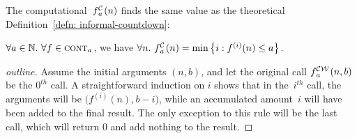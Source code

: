 \noindent The computational~$\cdt{f}{a}(n)$
finds the same value as the theoretical
Definition~\ref{defn: informal-countdown}:
\begin{thm} \label{thm: cdt-repeat}
	$\forall a \in \mathbb{N}.~ \forall f\in \text{\scshape{cont}}_{a}$, we have
$	\forall n.~ \cdt{f}{a}(n) = \min\left\{ i : f^{(i)}(n) \le a \right\} $.
\end{thm}
\begin{proof}[outline]
	Assume the initial arguments $(n, b)$, and let the original call 
	\linebreak $\cdw{f}{a}(n, b)$ be the $0^{th}$ call. A straightforward induction on $i$ shows that in the~$i^{th}$ call, the arguments will be $\big(f^{(i)}(n), b-i\big)$, while an accumulated amount~$i$ will have been added to the final result. The only exception to this rule will be the last call, which 
	will return $0$ and add nothing to the result.
	

\end{proof}
